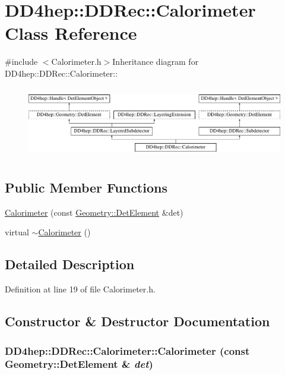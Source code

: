 \hypertarget{class_d_d4hep_1_1_d_d_rec_1_1_calorimeter}{
\section{DD4hep::DDRec::Calorimeter Class Reference}
\label{class_d_d4hep_1_1_d_d_rec_1_1_calorimeter}
}


{\ttfamily \#include $<$Calorimeter.h$>$}Inheritance diagram for DD4hep::DDRec::Calorimeter::\begin{figure}[H]
\begin{center}
\leavevmode
\includegraphics[height=3.16384cm]{class_d_d4hep_1_1_d_d_rec_1_1_calorimeter}
\end{center}
\end{figure}
\subsection*{Public Member Functions}
\begin{DoxyCompactItemize}
\item 
\hyperlink{class_d_d4hep_1_1_d_d_rec_1_1_calorimeter_a143f17b7c2614d114c1b767122ac0516}{Calorimeter} (const \hyperlink{class_d_d4hep_1_1_geometry_1_1_det_element}{Geometry::DetElement} \&det)
\item 
virtual \hyperlink{class_d_d4hep_1_1_d_d_rec_1_1_calorimeter_a173a06cc2634725e660a04fa65b36c09}{$\sim$Calorimeter} ()
\end{DoxyCompactItemize}


\subsection{Detailed Description}


Definition at line 19 of file Calorimeter.h.

\subsection{Constructor \& Destructor Documentation}
\hypertarget{class_d_d4hep_1_1_d_d_rec_1_1_calorimeter_a143f17b7c2614d114c1b767122ac0516}{
\subsubsection[{Calorimeter}]{\setlength{\rightskip}{0pt plus 5cm}DD4hep::DDRec::Calorimeter::Calorimeter (const {\bf Geometry::DetElement} \& {\em det})}}
\label{class_d_d4hep_1_1_d_d_rec_1_1_calorimeter_a143f17b7c2614d114c1b767122ac0516}


